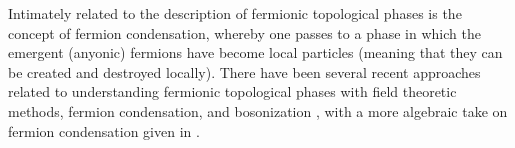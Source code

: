 Intimately related to the description of fermionic topological phases is the concept of fermion condensation, 
whereby one passes to a phase in which the emergent (anyonic) fermions have become 
local particles (meaning that they can be created and destroyed locally). 
There have been several recent approaches related to understanding 
fermionic topological phases with field theoretic methods, fermion condensation, and bosonization \cite{gaiotto2016, bhardwaj2016, bhardwaj2016b,kapustin2017,putrov2016}, 
with a more algebraic take on fermion condensation given in \cite{wan2016}. 

